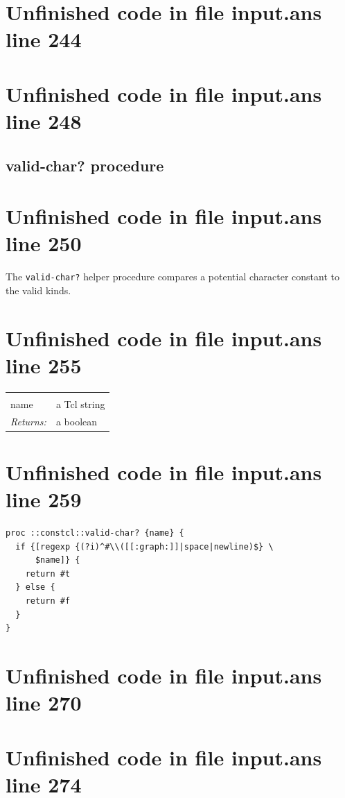 \documentclass[twoside,9pt]{report}
\begin{document}
\section{Unfinished code in file input.ans line 244}
\section{Unfinished code in file input.ans line 248}
\subsection{valid-char? procedure}
\label{valid-char?-procedure}
\section{Unfinished code in file input.ans line 250}


The \texttt{valid-char?} helper procedure compares a potential character constant to the valid kinds.

\section{Unfinished code in file input.ans line 255}
\noindent\begin{tabular}{ |p{1.9cm} p{8cm}| }
\hline
\rowcolor[HTML]{CCCCCC} \multicolumn{2}{|l|}{\bf valid-char? (internal)} \\
name & a Tcl string \\
\textit{Returns:} & a boolean \\
\hline
\end{tabular}
\section{Unfinished code in file input.ans line 259}
\begin{lstlisting}
proc ::constcl::valid-char? {name} {
  if {[regexp {(?i)^#\\([[:graph:]]|space|newline)$} \
      $name]} {
    return #t
  } else {
    return #f
  }
}
\end{lstlisting}
\section{Unfinished code in file input.ans line 270}
\section{Unfinished code in file input.ans line 274}
\end{document}
